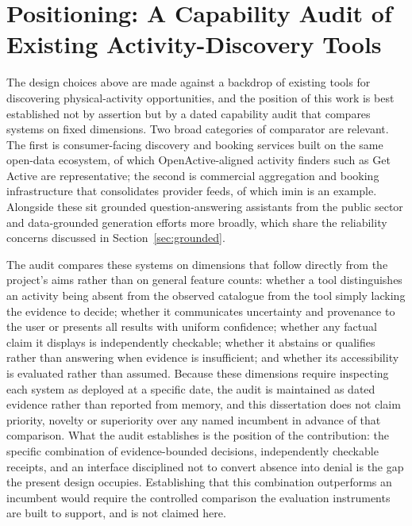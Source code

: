 \section{Positioning: A Capability Audit of Existing Activity-Discovery Tools}
\label{sec:audit}
The design choices above are made against a backdrop of existing tools for discovering physical-activity
opportunities, and the position of this work is best established not by assertion but by a dated
capability audit that compares systems on fixed dimensions. Two broad categories of comparator are
relevant. The first is consumer-facing discovery and booking services built on the same open-data
ecosystem, of which OpenActive-aligned activity finders such as Get Active are representative; the
second is commercial aggregation and booking infrastructure that consolidates provider feeds, of which
imin is an example. Alongside these sit grounded question-answering assistants from the public sector
and data-grounded generation efforts more broadly, which share the reliability concerns discussed in
Section~\ref{sec:grounded}.

The audit compares these systems on dimensions that follow directly from the project's aims rather than
on general feature counts: whether a tool distinguishes an activity being absent from the observed
catalogue from the tool simply lacking the evidence to decide; whether it communicates uncertainty and
provenance to the user or presents all results with uniform confidence; whether any factual claim it
displays is independently checkable; whether it abstains or qualifies rather than answering when
evidence is insufficient; and whether its accessibility is evaluated rather than assumed. Because these
dimensions require inspecting each system as deployed at a specific date, the audit is maintained as
dated evidence rather than reported from memory, and this dissertation does not claim priority, novelty
or superiority over any named incumbent in advance of that comparison. What the audit establishes is
the position of the contribution: the specific combination of evidence-bounded decisions, independently
checkable receipts, and an interface disciplined not to convert absence into denial is the gap the
present design occupies. Establishing that this combination outperforms an incumbent would require the
controlled comparison the evaluation instruments are built to support, and is not claimed here.


